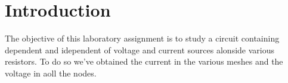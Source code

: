 \newpage
\section{Introduction}
\label{sec:introduction}
The objective of this laboratory assignment is to study a circuit containing dependent and idependent of voltage and current sources alonside various resistors. To do so we've obtained the current in the various meshes and the voltage in aoll the nodes. 
